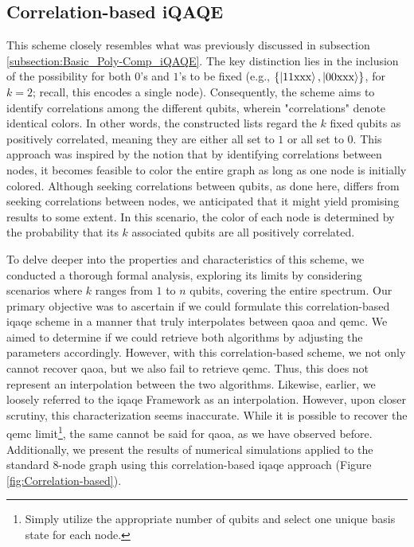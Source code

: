 \subsection{Correlation-based iQAQE}
\label{subsection:Correlation_iQAQE}
\vspace{-2.5mm}
This scheme closely resembles what was previously discussed in subsection \ref{subsection:Basic_Poly-Comp_iQAQE}. The key distinction lies in the inclusion of the possibility for both $0$'s and $1$'s to be fixed (e.g., $\{\ket{11\text{xxx}}, \ket{00\text{xxx}}\}$, for $k = 2$; recall, this encodes a single node). Consequently, the scheme aims to identify correlations among the different qubits, wherein "correlations" denote identical colors. In other words, the constructed lists regard the $k$ fixed qubits as positively correlated, meaning they are either all set to $1$ or all set to $0$. This approach was inspired by the notion that by identifying correlations between nodes, it becomes feasible to color the entire graph as long as one node is initially colored. Although seeking correlations between qubits, as done here, differs from seeking correlations between nodes, we anticipated that it might yield promising results to some extent. In this scenario, the color of each node is determined by the probability that its $k$ associated qubits are all positively correlated.

To delve deeper into the properties and characteristics of this scheme, we conducted a thorough formal analysis, exploring its limits by considering scenarios where $k$ ranges from $1$ to $n$ qubits, covering the entire spectrum. Our primary objective was to ascertain if we could formulate this correlation-based \acrshort{iqaqe} scheme in a manner that truly interpolates between \acrshort{qaoa} and \acrshort{qemc}. We aimed to determine if we could retrieve both algorithms by adjusting the parameters accordingly. However, with this correlation-based scheme, we not only cannot recover \acrshort{qaoa}, but we also fail to retrieve \acrshort{qemc}. Thus, this does not represent an interpolation between the two algorithms. Likewise, earlier, we loosely referred to the \acrshort{iqaqe} Framework as an interpolation. However, upon closer scrutiny, this characterization seems inaccurate. While it is possible to recover the \acrshort{qemc} limit\footnote{Simply utilize the appropriate number of qubits and select one unique basis state for each node.}, the same cannot be said for \acrshort{qaoa}, as we have observed before. Additionally, we present the results of numerical simulations applied to the standard $8$-node graph using this correlation-based \acrshort{iqaqe} approach (Figure \ref{fig:Correlation-based}).


